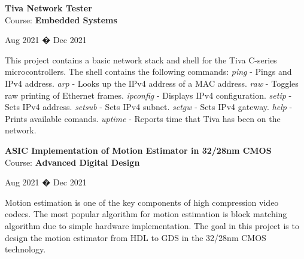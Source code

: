 \documentclass[10pt]{article}
\newenvironment{innerlist}[1][\enskip\textbullet]%
        {\begin{compactitem}[#1]}{\end{compactitem}}
\begin{document}
\textbf{Tiva Network Tester} \\ 
Course: \textbf{Embedded Systems} \\
\vspace*{-32pt} \begin{flushright} Aug 2021 � Dec 2021 \end{flushright}
\vspace*{-2pt} 
\begin{innerlist} \item This project contains a basic network stack and shell for the Tiva C-series microcontrollers. The shell contains the following commands:
   \subitem \emph{ping} - Pings and IPv4 address.
   \subitem \emph{arp} - Looks up the IPv4 address of a MAC address.
   \subitem \emph{raw} - Toggles raw printing of Ethernet frames.
   \subitem \emph{ipconfig} - Displays IPv4 configuration.
   \subitem \emph{setip} - Sets IPv4 address.
   \subitem \emph{setsub} - Sets IPv4 subnet.
   \subitem \emph{setgw} - Sets IPv4 gateway.
   \subitem \emph{help} - Prints available comands.
   \subitem \emph{uptime} - Reports time that Tiva has been on the network.
\end{innerlist}  \vspace*{10pt}

\textbf{ASIC Implementation of Motion Estimator in 32/28nm CMOS} \\ 
Course: \textbf{Advanced Digital Design} \\
\vspace*{-32pt} \begin{flushright} Aug 2021 � Dec 2021 \end{flushright}
\vspace*{-2pt} 
\begin{innerlist} \item Motion estimation is one of the key components of high compression video codecs. The most popular algorithm for motion estimation is block matching algorithm due to simple hardware implementation. The goal in this project is to design the motion estimator from HDL to GDS in the 32/28nm CMOS technology.
\end{innerlist}  \vspace*{4pt}
\end{document}
